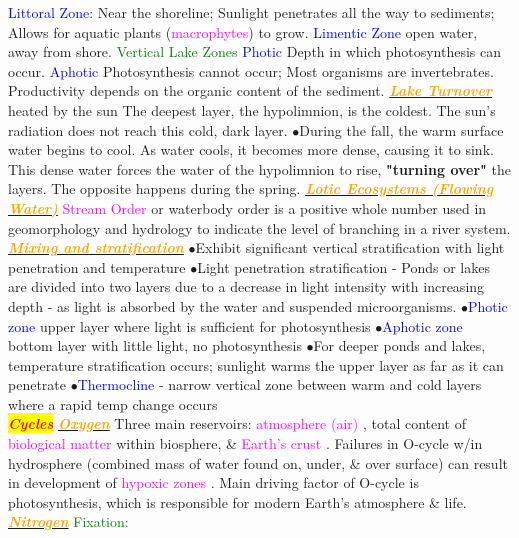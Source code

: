 \documentclass{article}
\newcommand{\ddd}{$\bullet$}
\newcommand{\red}[1]{\textcolor{red}{#1}}
\newcommand{\green}[1]{\textcolor{green}{#1}}
\newcommand{\blue}[1]{\textcolor{blue}{#1}}
\newcommand{\pink}[1]{\textcolor{magenta}{#1}}
\newcommand{\orange}[1]{\textcolor{orange}{#1}}
\newcommand{\mysection}[1]{\colorbox{yellow}{\textbf{\textit{\red{#1}}}}}
\newcommand{\mysubsection}[1]{\underline{\textbf{{\textit{\orange{#1}}}}}}
\newcommand{\mysubsub}[1]{{{\green{#1}}}}
\newcommand{\mysubsubsub}[1]{{{\blue{#1}}}}
\newcommand{\vocab}[1]{{\pink{#1}}}
\begin{document}
\begin{multicols*}{4}
                \mysubsubsub{Littoral Zone}: Near the shoreline; Sunlight penetrates all the way to sediments; Allows for aquatic plants (\vocab{macrophytes}) to grow.
                \mysubsubsub{Limentic Zone} open water, away from shore.
            \mysubsub{Vertical Lake Zones}
                \mysubsubsub{Photic}
                    Depth in which photosynthesis can occur.
                \mysubsubsub{Aphotic}
                Photosynthesis cannot occur; Most organisms are invertebrates. Productivity depends on the organic content of the sediment.
          \mysubsection{Lake Turnover}
               heated by the sun The deepest layer, the hypolimnion, is the coldest. The sun's radiation does not reach this cold, dark layer. 
        	  \ddd During the fall, the warm surface water begins to cool. As water cools, it becomes more dense, causing it to sink. This dense water forces the water of the hypolimnion to rise, \textbf{"turning over"} the layers. The opposite happens during the spring.
        	  \mysubsection{Lotic Ecosystems (Flowing Water)}
        	  \vocab{Stream Order} or waterbody order is a positive whole number used in geomorphology and hydrology to indicate the level of branching in a river system. 
        \mysubsection{Mixing and stratification}
            \ddd Exhibit significant vertical stratification with light penetration and temperature 
            \ddd Light penetration stratification - Ponds or lakes are divided into two layers due to a decrease in light intensity with increasing depth - as light is absorbed by the water and suspended microorganisms.
            \ddd \blue{Photic zone} upper layer where light is sufficient for photosynthesis
            \ddd \blue{Aphotic zone} bottom layer with little light, no photosynthesis
            \ddd For deeper ponds and lakes, temperature stratification occurs; sunlight warms the upper layer as far as it can penetrate
            \ddd \blue{Thermocline} - narrow vertical zone between warm and cold layers where a rapid temp change occurs 
   	\\
	\mysection{Cycles}
		\mysubsection{Oxygen}
		Three main reservoirs: \pink{ atmosphere (air) }, total content of \pink{ biological matter } within biosphere, \& \pink{ Earth's crust }. Failures in O-cycle w/in hydrosphere (combined mass of water found on, under, \& over surface) can result in development of \pink{ hypoxic zones }. Main driving factor of O-cycle is photosynthesis, which is responsible for modern Earth's atmosphere \& life. 
		\mysubsection{Nitrogen}
			\mysubsub{Fixation: } 

\end{multicols*}
\end{document}
